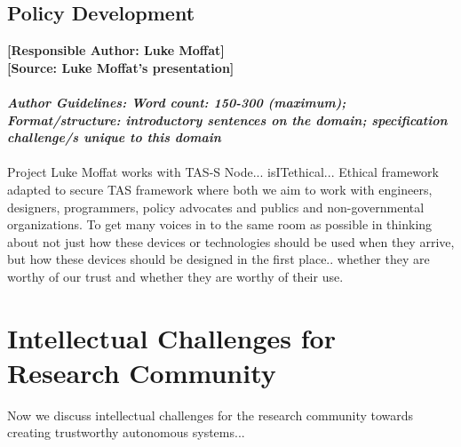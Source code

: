 \documentclass[sigconf]{acmart}
\begin{document}
\subsection{Policy Development}
\textbf{[Responsible Author:  Luke Moffat]}\\
\textbf{[Source: Luke Moffat's presentation]} 
\\\\
\noindent\textbf{\textit{Author Guidelines: Word count: 150-300 (maximum); \\Format/structure: introductory sentences on the domain; specification challenge/s unique to this domain}}\\\\
Project Luke Moffat works with TAS-S Node...
isITethical...
Ethical framework adapted to secure TAS framework where both we aim to work with engineers, designers, programmers, policy advocates and publics and non-governmental organizations. To get many voices in to the same room as possible in thinking about not just how these devices or technologies should be used when they arrive, but how these devices should be designed in the first place.. whether they are worthy of our trust and whether they are worthy of their use.


\section{Intellectual Challenges for Research Community}
Now we discuss intellectual challenges for the research community towards creating trustworthy autonomous systems... \\

\end{document}
